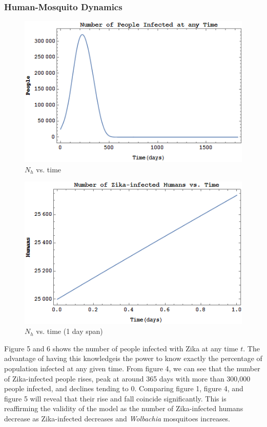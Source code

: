 \documentclass{article}
\begin{document}
\subsubsection{Human-Mosquito Dynamics}
\begin{figure}[h!]
  \includegraphics[width=\linewidth]{NhVSt}
  \caption{$N_h$ vs. time}
  \label{fig:nhvst}
\end{figure}
\begin{figure}[h!]
  \includegraphics[width=\linewidth]{NhVst-init}
  \caption{$N_h$ vs. time (1 day span)}
  \label{fig:nhvstinit}
\end{figure}

Figure 5 and 6 shows the number of people infected with Zika at any time $t$. The advantage of having this knowledgeis the power to know exactly the percentage of population infected at any given time. From figure 4, we can see that the number of Zika-infected people rises, peak at around 365 days with more than 300,000 people infected, and declines tending to 0. Comparing figure 1, figure 4, and figure 5 will reveal that their rise and fall coincide significantly. This is reaffirming the validity of the model as the number of Zika-infected humans decrease as Zika-infected decreases and \textit{Wolbachia} mosquitoes increases.\\
\end{document}
